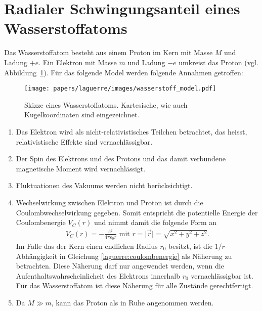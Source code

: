 %
%
%
\section{Radialer Schwingungsanteil eines Wasserstoffatoms
\label{laguerre:section:radial_h_atom}}

Das Wasserstoffatom besteht aus einem Proton im Kern 
mit Masse $M$ und Ladung $+e$.
Ein Elektron mit Masse $m$ und Ladung $-e$ umkreist das Proton
(vgl. Abbildung~\ref{laguerre:fig:wasserstoff_model}).
Für das folgende Model werden folgende Annahmen getroffen:

\begin{figure}
\centering
\texttt{[image: papers/laguerre/images/wasserstoff\_model.pdf]}
\caption{Skizze eines Wasserstoffatoms.
Kartesische, wie auch Kugelkoordinaten sind eingezeichnet.
}
\label{laguerre:fig:wasserstoff_model}
\end{figure}

\begin{enumerate}
\item 
Das Elektron wird als nicht-relativistisches Teilchen betrachtet, 
das heisst,
relativistische Effekte sind vernachlässigbar.
\item        
Der Spin des Elektrons und des Protons
und das damit verbundene magnetische Moment
wird vernachlässigt.
\item
Fluktuationen des Vakuums werden nicht berücksichtigt.
\item
Wechselwirkung zwischen Elektron und Proton
ist durch die Coulombwechselwirkung gegeben. 
Somit entspricht die potentielle Energie der Coulombenergie $V_C(r)$
und nimmt damit die folgende Form an
\begin{align}
    V_C(r) 
    = 
    -\frac{e^2}{4 \pi \epsilon_0 r}
    \text{ mit }
    r
    =
    \lvert\vec{r}\rvert
    = 
    \sqrt{x^2 + y^2 + z^2}
    .
    \label{laguerre:coulombenergie}
\end{align}
Im Falle das der Kern einen endlichen Radius $r_0$ besitzt,
ist die $1/r$-Abhängigkeit in Gleichung \eqref{laguerre:coulombenergie}
als Näherung zu betrachten.
Diese Näherung darf nur angewendet werden, wenn die 
Aufenthaltswahrscheinlicheit des Elektrons
innerhalb $r_0$ vernachlässigbar ist.
Für das Wasserstoffatom ist diese Näherung für alle Zustände gerechtfertigt.
\item
Da $M \gg m$, kann das Proton als in Ruhe angenommen werden.
\end{enumerate}

